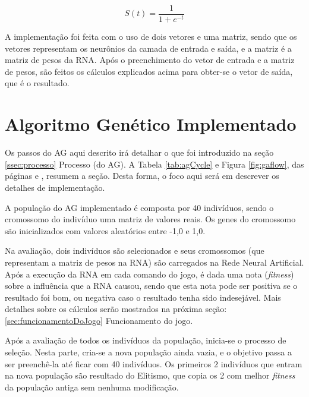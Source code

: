 \documentclass[
	12pt,					%
	openright,				%
	oneside,				%
	a4paper,				%
	bibjustif,				%
	chapter=TITLE,			%
	english,				%
	brazil,					%
	]{abntex2}
\begin{document}
	\begin{equation}
		S(t) = \frac{1}{1 + e^{-t}}
		\label{eq:sigmoid}
	\end{equation}
	
	\vspace{3mm}
	
	A implementação foi feita com o uso de dois vetores e uma matriz,
	sendo que os vetores representam os neurônios da camada de entrada e saída,
	e a matriz é a matriz de pesos da RNA.
	Após o preenchimento do vetor de entrada e a matriz de pesos,
	são feitos os cálculos explicados acima para obter-se o vetor de saída,
	que é o resultado.
	
	\FloatBarrier
	\section{Algoritmo Genético Implementado}
	Os passos do AG aqui descrito irá detalhar o que foi introduzido na seção \ref{ssec:processo} Processo (do AG).
	A Tabela \ref{tab:agCycle} e Figura \ref{fig:gaflow},
	das páginas \pageref{tab:agCycle} e \pageref{fig:gaflow},
	resumem a seção.
	Desta forma, o foco aqui será em descrever os detalhes de implementação.
	
	A população do AG implementado é composta por 40 indivíduos,
	sendo o cromossomo do indivíduo uma matriz de valores reais.
	Os genes do cromossomo são inicializados com valores aleatórios entre -1,0 e 1,0.
	
	Na avaliação,
	dois indivíduos são selecionados e seus cromossomos
	(que representam a matriz de pesos na RNA)
	são carregados na Rede Neural Artificial.
	Após a execução da RNA em cada comando do jogo,
	é dada uma nota (\textit{fitness}) sobre a influência que a RNA causou,
	sendo que esta nota pode ser
	positiva se o resultado foi bom,
	ou negativa caso o resultado tenha sido indesejável.
	Mais detalhes sobre os cálculos serão mostrados na próxima seção:
	\ref{sec:funcionamentoDoJogo} Funcionamento do jogo.
	
	Após a avaliação de todos os indivíduos da população,
	inicia-se o processo de seleção.
	Nesta parte, cria-se a nova população ainda vazia,
	e o objetivo passa a ser preenchê-la até ficar com 40 indivíduos.
	Os primeiros 2 indivíduos que entram na nova população são resultado do Elitismo,
	que copia os 2 com melhor \textit{fitness} da população antiga sem nenhuma modificação.
	
\end{document}

